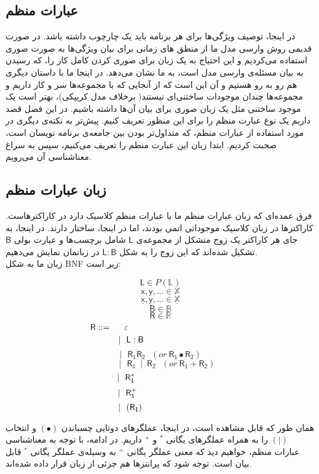 \subsection{عبارات منظم}
در اینجا، توصیف ویژگی‌ها برای هر برنامه باید یک چارچوب داشته باشد. در صورت قدیمی روش وارسی مدل ما از منطق های زمانی برای بیان ویژگی‌ها به صورت صوری استفاده می‌کردیم و این احتیاج به یک زبان برای صوری کردن کامل کار را، که رسیدن به بیان مسئله‌ی وارسی مدل است، به ما نشان می‌دهد. در اینجا ما با داستان دیگری هم رو به رو هستیم و آن این است که از آنجایی که با مجموعه‌ها سر و کار داریم و مجموعه‌ها چندان موجودات ساختنی‌ای نیستند( برخلاف مدل کریپکی)، بهتر است یک موجود ساختنی مثل یک زبان صوری برای بیان آن‌ها داشته باشیم. در این فصل قصد داریم یک نوع عبارت منظم را برای این منظور تعریف کنیم. پیش‌تر به نکته‌ی دیگری در مورد استفاده از عبارات منظم، که متداول‌تر بودن بین جامعه‌ی برنامه نویسان است، صحبت کردیم. ابتدا زبان این عبارت منظم را تعریف می‌کنیم، سپس به سراغ معناشناسی آن می‌رویم. 
\subsection{زبان عبارات منظم}
فرق عمده‌ای که زبان عبارات منظم ما با عبارات منظم کلاسیک دارد در کاراکترهاست. کاراکترها در زبان کلاسیک موجوداتی اتمی بودند، اما در اینجا، ساختار دارند. در اینجا، به جای هر کاراکتر یک زوج متشکل از مجموعه‌ی $\mathsf{L}$ شامل برچسب‌ها و عبارت بولی $\mathsf{B}$ تشکیل شده‌اند که این زوج را به شکل 
$\mathsf{L : B}$
در زبانمان نمایش می‌دهیم.\\ 
زبان ما به شکل BNF زیر است:
\begin{defn}
$$\mathsf{L} \in \mathit{P}(\mathbb{L})$$        
$$\mathsf{x,y,...} \in \mathbb{X}$$
$$\mathsf{\underline{x},\underline{y},...} \in \mathbb{\underline{X}}$$
$$\mathsf{B} \in \mathbb{B}$$
$$\mathsf{R} \in \mathbb{R}$$
$$\mathsf{R} ::=\hspace{0.5cm} \varepsilon\hspace{4.2cm}$$
$$|\:\:\:\mathsf{L : B}\hspace{2.4cm}$$
$$|\:\:\:\mathsf{R_1 R_2}\:\:\:(or\:\mathsf{R_1 \bullet R_2 })$$
$$\:\:\:\:\:\:\:|\:\:\:\mathsf{R_1\:\mid\:R_2}\:\:\:(or\:\mathsf{R_1 + R_2 })$$
$$|\:\:\:\mathsf{R_1^*}\hspace{2.8cm}$$
$$|\:\:\:\mathsf{R_1^+}\hspace{2.7cm}$$
$$|\:\:\:(\mathsf{R_1})\hspace{2.47cm}$$
\end{defn}
همان طور که قابل مشاهده است، در اینجا، عملگرهای دوتایی چسباندن
$(\bullet)$
 و انتخاب
$(|)$
 را به همراه عملگرهای یگانی 
$^*$
و
$^+$
داریم.
در ادامه، با توجه به معناشناسی عبارات منظم، خواهیم دید که معنی عملگر یگانی 
$^+$
به وسیله‌ی عملگر یگانی $^*$ قابل بیان است.
توجه شود که پرانتزها هم جزئی از زبان قرار داده شده‌اند.


